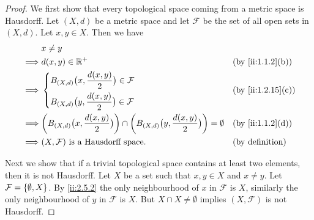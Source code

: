 \begin{proof}
  We first show that every topological space coming from a metric space is Hausdorff.
  Let \((X, d)\) be a metric space and let \(\mathcal{F}\) be the set of all open sets in \((X, d)\).
  Let \(x, y \in X\).
  Then we have
  \begin{align*}
             & x \neq y                                                                                                                                                 \\
    \implies & d(x, y) \in \R^+                                                                                                             &  & \by{ii:1.1.2}[b]          \\
    \implies & \begin{dcases}
                 B_{(X, d)}\big(x, \dfrac{d(x, y)}{2}\big) \in \mathcal{F} \\
                 B_{(X, d)}\big(y, \dfrac{d(x, y)}{2}\big) \in \mathcal{F}
               \end{dcases}                                                            &  & \by{ii:1.2.15}[c]                                                              \\
    \implies & \bigg(B_{(X, d)}\big(x, \dfrac{d(x, y)}{2}\big)\bigg) \cap \bigg(B_{(X, d)}\big(y, \dfrac{d(x, y)}{2}\big)\bigg) = \emptyset &  & \by{ii:1.1.2}[d]          \\
    \implies & (X, \mathcal{F}) \text{ is a Hausdorff space}.                                                                               &  & \text{(by definition)}
  \end{align*}

  Next we show that if a trivial topological space contains at least two elements, then it is not Hausdorff.
  Let \(X\) be a set such that \(x, y \in X\) and \(x \neq y\).
  Let \(\mathcal{F} = \left\lbrace\emptyset, X\right\rbrace\).
  By \cref{ii:2.5.2} the only neighbourhood of \(x\) in \(\mathcal{F}\) is \(X\), similarly the only neighbourhood of \(y\) in \(\mathcal{F}\) is \(X\).
  But \(X \cap X \neq \emptyset\) implies \((X, \mathcal{F})\) is not Hausdorff.


\end{proof}
